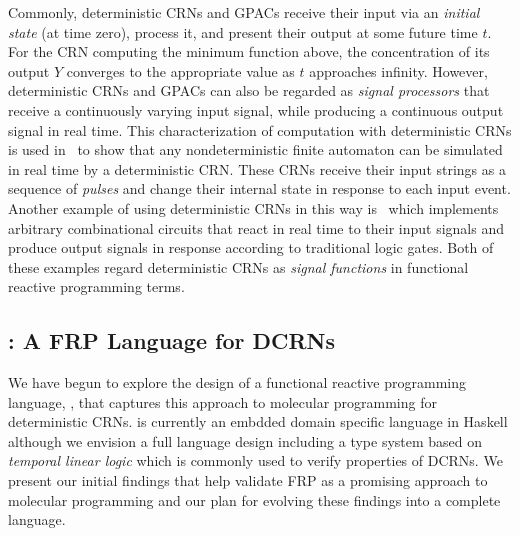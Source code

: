 Commonly, deterministic CRNs and GPACs receive their input via an \emph{initial state} (at time zero), process it, and present their output at some future time \( t \).
For the CRN computing the minimum function above, the concentration of its output \( Y \) converges to the appropriate value as \( t \) approaches infinity.
However, deterministic CRNs and GPACs can also be regarded as \emph{signal processors} that receive a continuously varying input signal, while producing a continuous output signal in real time.
This characterization of computation with deterministic CRNs is used in~\cite{jKlLaLu20} to show that any nondeterministic finite automaton can be simulated in real time by a deterministic CRN.
These CRNs receive their input strings as a sequence of \emph{pulses} and change their internal state in response to each input event.
Another example of using deterministic CRNs in this way is~\cite{rdc} which implements arbitrary combinational circuits that react in real time to their input signals and produce output signals in response according to traditional logic gates.
Both of these examples regard deterministic CRNs as \emph{signal functions} in functional reactive programming terms.


\subsection{\reactamole{}: A FRP Language for DCRNs}

We have begun to explore the design of a functional reactive programming language, \reactamole{}, that captures this approach to molecular programming for deterministic CRNs.
\reactamole is currently an embdded domain specific language in Haskell although we envision a full language design including a type system based on \emph{temporal linear logic} which is commonly used to verify properties of DCRNs.
We present our initial findings that help validate FRP as a promising approach to molecular programming and our plan for evolving these findings into a complete language.

